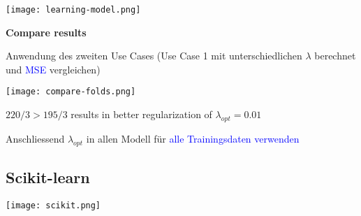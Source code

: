 \texttt{[image: learning-model.png]} \\
\columnbreak

\textbf{Compare results}

Anwendung des zweiten Use Cases (Use Case 1 mit unterschiedlichen $\lambda$ berechnet und \textcolor{blue}{MSE} vergleichen)

\texttt{[image: compare-folds.png]}

$220/3 > 195/3$ results in better regularization of $\lambda_{opt} = 0.01$

Anschliessend $\lambda_{opt}$ in allen Modell für \textcolor{blue}{alle Trainingsdaten verwenden}

\subsection{Scikit-learn}

\texttt{[image: scikit.png]}
